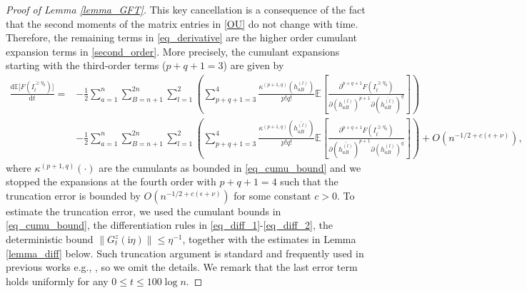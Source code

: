 \documentclass[10pt,reqno]{amsart}
\newcommand{\II}{I^{\geq \eta_0}} %
\newcommand{\dd}{\mathrm{d}}
\newcommand{\ii}{\mathrm{i}}
\newcommand{\eg}{e.g., }
\newcommand{\<}{\langle}
\renewcommand{\>}{\rangle}
\numberwithin{equation}{section}
\begin{document}
\begin{proof}[Proof of Lemma \ref{lemma_GFT}]
This key cancellation is a consequence of the fact that the second moments of the matrix entries in \eqref{OU} do not change with time. Therefore, the remaining terms in \eqref{eq_derivative} are the higher order cumulant expansion terms in \eqref{second_order}. More precisely, the cumulant expansions starting with the third-order terms ($p+q+1=3$) are given by
\begin{align}\label{eq_cumulant_exp}
	\frac{\dd \mathbb{E}\big[ F(\II_t)\big]}{\dd t}
	=&-\frac{1}{2} \sum_{a=1}^n \sum_{B=n+1}^{2n}
	\sum_{l=1}^2 \left( \sum_{p+q+1= 3}^{4}\frac{\kappa^{(p+1,q)}(h^{(l)}_{aB})}{p!q!}
	\mathbb{E} \left[   \frac{\partial^{p+q+1} F(\II_t)}{\partial (h^{(l)}_{aB})^{p+1} \partial (\overline{h^{(l)}_{aB}})^{q} } \right] \right)\nonumber\\
	&-\frac{1}{2} \sum_{a=1}^n \sum_{B=n+1}^{2n} \sum_{l=1}^2 \left(\sum_{p+q+1 = 3}^{4}\frac{\kappa^{(p+1,q)}(\overline{h^{(l)}_{aB}})}{p!q!}
	\mathbb{E} \left[   \frac{\partial^{p+q+1} F(\II_t) }{\partial (\overline{h^{(l)}_{aB}})^{p+1} \partial (h^{(l)}_{aB})^{q}}\right]\right)+O(n^{-1/2+c(\epsilon+\nu)}),
\end{align}
 where $\kappa^{(p+1,q)}(\cdot)$ are the cumulants as bounded in \eqref{eq_cumu_bound} and we stopped the expansions at the fourth order with $p+q+1=4$ such that the truncation error is bounded by $O(n^{-1/2+c(\epsilon+\nu)})$ for some constant $c>0$. To estimate the truncation error, we used the cumulant bounds in \eqref{eq_cumu_bound}, the differentiation rules in \eqref{eq_diff_1}-\eqref{eq_diff_2}, the deterministic bound $\|G_t^z(\ii \eta)\| \leq \eta^{-1}$, together with the estimates in Lemma \ref{lemma_diff} below.  Such truncation argument is standard and frequently used in previous works \eg \cite{zbMATH06775355,zbMATH07549410,cipolloni2024universalityextremaleigenvalueslarge}, so we omit the details. We remark that the last error term holds uniformly for any $0\leq t\leq 100 \log n$. 


\end{proof}
\end{document}
